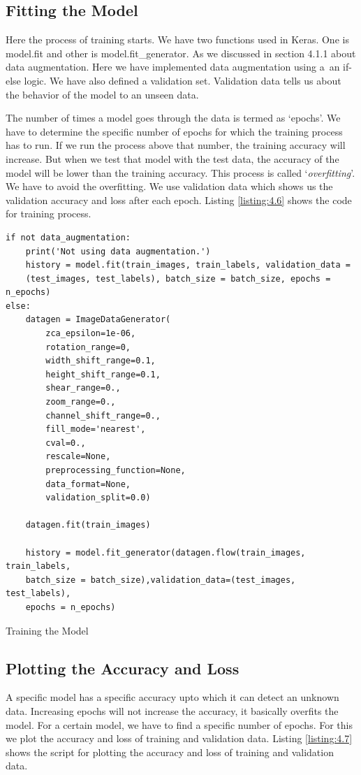 \subsection{Fitting the Model}
Here the process of training starts. We have two functions used in Keras. One
is model.fit and other is model.fit\_generator. As we discussed in section 4.1.1
about data augmentation. Here we have implemented data augmentation using a\
an if-else logic. We have also defined a validation set. Validation data tells us about the
behavior of the model to an unseen data.

The number of times a model goes through the data is termed as `epochs'.
We have to determine the specific number of epochs for which the training process has to
run. If we run the process above that number, the training accuracy will
increase. But when we test that model with the test data, the accuracy of the model
will be lower than the training accuracy. This process is called `\textit{overfitting}'.
We have to avoid the overfitting. We use validation data which shows us the validation accuracy
and loss after each epoch. Listing \ref{listing:4.6} shows the code for training process.

\begin{longlisting}
    \begin{verbatim}
if not data_augmentation:
    print('Not using data augmentation.')
    history = model.fit(train_images, train_labels, validation_data =
    (test_images, test_labels), batch_size = batch_size, epochs = n_epochs)
else:
    datagen = ImageDataGenerator(
        zca_epsilon=1e-06,
        rotation_range=0,  
        width_shift_range=0.1,
        height_shift_range=0.1,
        shear_range=0.,
        zoom_range=0.,
        channel_shift_range=0.,
        fill_mode='nearest',
        cval=0.,
        rescale=None,
        preprocessing_function=None,
        data_format=None,
        validation_split=0.0)
    
    datagen.fit(train_images)
    
    history = model.fit_generator(datagen.flow(train_images, train_labels,
    batch_size = batch_size),validation_data=(test_images, test_labels),
    epochs = n_epochs)    
    \end{verbatim}
    \caption{Training the Model}
\label{listing:4.6}
\end{longlisting}
\subsection{Plotting the Accuracy and Loss}
A specific model has a specific accuracy upto which it can detect an unknown data.
Increasing epochs will not increase the accuracy, it basically overfits
the model. For a certain model, we have to find a specific number
of epochs. For this we plot the accuracy and loss of training and
validation data. Listing \ref{listing:4.7} shows the script for plotting the accuracy and
loss of training and validation data.


